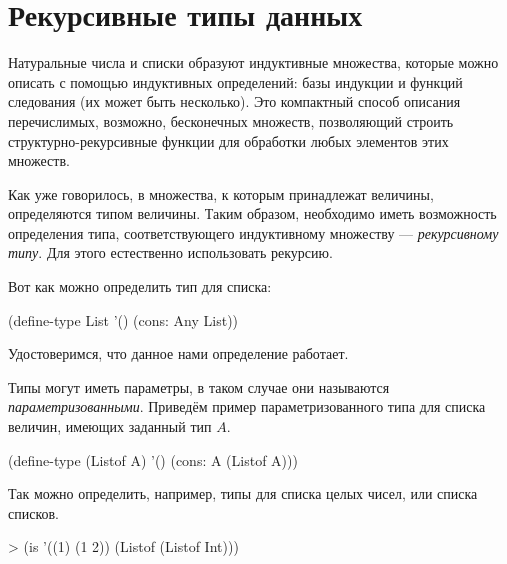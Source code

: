 \section{Рекурсивные типы данных}%
Натуральные числа и списки образуют индуктивные множества, которые можно описать с помощью индуктивных определений: базы индукции и функций следования (их может быть несколько). Это компактный способ описания перечислимых, возможно, бесконечных множеств, позволяющий строить структурно-рекурсивные функции для обработки любых элементов этих множеств.

Как уже говорилось, в \Scheme множества, к которым принадлежат величины, определяются типом величины. Таким образом, необходимо иметь возможность определения типа, соответствующего индуктивному множеству --- \emph{рекурсивному типу}. Для этого естественно использовать рекурсию.

Вот как можно определить тип для списка:

\begin{SchemeCode}
(define-type List
  '()
  (cons: Any List))
\end{SchemeCode}

\begin{example}{Удостоверимся, что данное нами определение работает.}
\end{example}

Типы могут иметь параметры, в таком случае они называются \emph{параметризованными}. Приведём пример параметризованного типа для списка величин, имеющих заданный тип $A$.

\begin{SchemeCode}[emph={A}]
(define-type (Listof A)
  '()
  (cons: A (Listof A)))
\end{SchemeCode}


\begin{example}{Так можно определить, например, типы для списка целых чисел, или списка списков.}
\begin{ExampleCode}
> (is '((1) (1 2))
      (Listof (Listof Int)))
\end{ExampleCode}
\end{example}

